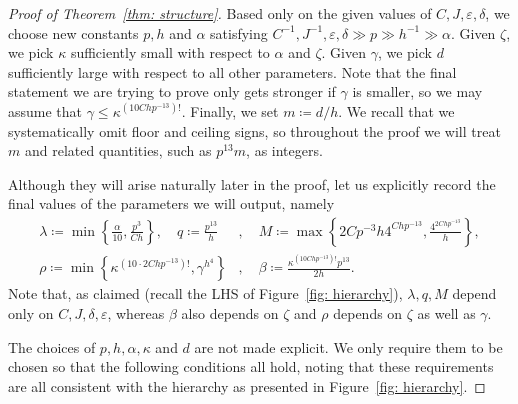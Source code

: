 \documentclass[10pt]{article}
\theoremstyle{definition}
\let\leq\leqslant
\begin{document}
\begin{proof}[Proof of Theorem~\ref{thm: structure}] Based only on the given values of $C,J,\varepsilon,\delta$, we choose new constants $p,h$ and $\alpha$ satisfying
$C^{-1},J^{-1},\varepsilon,\delta \gg p\gg  h^{-1}\gg \alpha$. Given $\zeta$, we pick $\kappa$ sufficiently small with respect to $\alpha$ and $\zeta$. Given $\gamma$, we pick $d$ sufficiently large with respect to all other parameters. Note that the final statement we are trying to prove only gets stronger if $\gamma$ is smaller, so we may assume that $\gamma \leq \kappa^{(10Chp^{-13})!}$. Finally, we set $m\coloneqq d/h$. We recall that we systematically omit floor and ceiling signs, so throughout the proof we will treat $m$ and related quantities, such as $p^{13}m$, as integers. 



Although they will arise naturally later in the proof, let us explicitly record the final values of the parameters we will output, namely
\begin{align*}
\lambda \coloneqq \min \left\{\frac \alpha{10},\frac{p^3}{Ch}\right\}, \quad q \coloneqq \frac{p^{13}}{h}&, \quad M \coloneqq \max\left\{2Cp^{-3}h4^{Chp^{-13}},\frac{4^{2Chp^{-13}}}{h}\right\},\\  \rho \coloneqq \min\left\{\kappa^{(10\cdot2Chp^{-13})!}, \gamma^{h^4}\right\}&, \quad \beta\coloneqq\frac{\kappa^{(10Chp^{-13})!}p^{13}}{2h}.
\end{align*}
Note that, as claimed (recall the LHS of Figure~\ref{fig: hierarchy}), $\lambda,q,M$ depend only on $C,J,\delta,\varepsilon$, whereas $\beta$ also depends on $\zeta$ and $\rho$ depends on $\zeta$ as well as $\gamma$.
\par The choices of $p,h,\alpha, \kappa$ and $d$ are not made explicit. We only require them to be chosen so that the following conditions all hold, noting that these requirements are all consistent with the hierarchy as presented in Figure~\ref{fig: hierarchy}. 


\end{proof}
\end{document}
